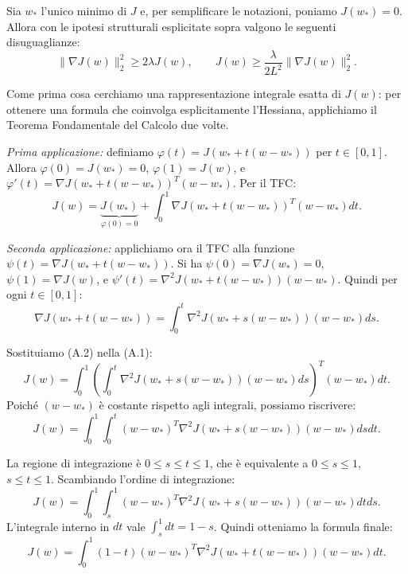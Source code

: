 \documentclass[italian, a4paper, twoside, binding=6mm]{sapthesis}
\begin{document}
Sia $w_*$ l'unico minimo di $J$ e, per semplificare le notazioni, poniamo $J(w_*) = 0$. Allora con le ipotesi strutturali esplicitate sopra valgono le seguenti disuguaglianze:
\[
\|\nabla J(w)\|_2^2 \geq 2\lambda J(w), \qquad J(w) \geq \frac{\lambda}{2L^2} \|\nabla J(w)\|_2^2.
\]

Come prima cosa cerchiamo una rappresentazione integrale esatta di $J(w)$: per ottenere una formula che coinvolga esplicitamente l'Hessiana, applichiamo il Teorema Fondamentale del Calcolo due volte.

\textit{Prima applicazione:} definiamo $\varphi(t) = J(w_* + t(w - w_*))$ per $t \in [0, 1]$. Allora $\varphi(0) = J(w_*) = 0$, $\varphi(1) = J(w)$, e $\varphi'(t) = \nabla J(w_* + t(w - w_*))^T (w - w_*)$. Per il TFC:
\[
J(w) = \underbrace{J(w_*)}_{\varphi(0)=0} + \int_0^1 \nabla J(w_* + t(w - w_*))^T (w - w_*) dt. \tag{A.1}
\]

\textit{Seconda applicazione:} applichiamo ora il TFC alla funzione $\psi(t) = \nabla J(w_* + t(w - w_*))$. Si ha $\psi(0) = \nabla J(w_*) = 0$, $\psi(1) = \nabla J(w)$, e $\psi'(t) = \nabla^2 J(w_* + t(w - w_*))(w - w_*)$. Quindi per ogni $t \in [0, 1]$:
\[
\nabla J(w_* + t(w - w_*)) = \int_0^t \nabla^2 J(w_* + s(w - w_*))(w - w_*) ds. \tag{A.2}
\]

Sostituiamo (A.2) nella (A.1):
\[
J(w) = \int_0^1 \left( \int_0^t \nabla^2 J(w_* + s(w - w_*))(w - w_*) ds \right)^T (w - w_*) dt.
\]
Poiché $(w - w_*)$ è costante rispetto agli integrali, possiamo riscrivere:
\[
J(w) = \int_0^1 \int_0^t (w - w_*)^T \nabla^2 J(w_* + s(w - w_*))(w - w_*) ds dt.
\]

La regione di integrazione è $0 \leq s \leq t \leq 1$, che è equivalente a $0 \leq s \leq 1$, $s \leq t \leq 1$. Scambiando l'ordine di integrazione:
\[
J(w) = \int_0^1 \int_s^1 (w - w_*)^T \nabla^2 J(w_* + s(w - w_*))(w - w_*) dt ds.
\]
L'integrale interno in $dt$ vale $\int_s^1 dt = 1 - s$. Quindi otteniamo la formula finale:
\[
J(w) = \int_0^1 (1 - t) (w - w_*)^T \nabla^2 J(w_* + t(w - w_*))(w - w_*) dt. \tag{A.3}
\]
\end{document}
